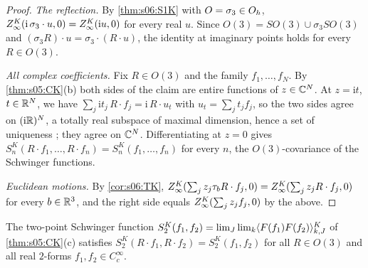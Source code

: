 \begin{proof}
\emph{The reflection.} By \cref{thm:s06:S1K} with $O=\sigma_3\in O_h$, $Z^{K}_{\infty}(\mathrm i\,\sigma_3\cdot u,0)=Z^{K}_{\infty}(\mathrm iu,0)$ for every
real $u$. Since $O(3)=SO(3)\cup\sigma_3SO(3)$ and $(\sigma_3R)\cdot u=\sigma_3\cdot(R\cdot u)$, the identity at imaginary points holds for
every $R\in O(3)$.

\emph{All complex coefficients.} Fix $R\in O(3)$ and the family $f_1,\dots,f_N$. By \cref{thm:s05:CK}(b) both sides of the claim are
entire functions of $z\in\mathbb C^N$. At $z=\mathrm it$, $t\in\mathbb R^N$, we have $\sum_j\mathrm it_j\,R\cdot f_j=\mathrm i\,R\cdot u_t$ with
$u_t=\sum_jt_jf_j$, so the two sides agree on $(\mathrm i\mathbb R)^N$, a totally real subspace of maximal dimension, hence a set of
uniqueness \cite{Hor90}; they agree on $\mathbb C^N$. Differentiating at $z=0$ gives $S^K_n(R\cdot f_1,\dots,R\cdot f_n)=S^K_n(f_1,\dots,f_n)$
for every $n$, the $O(3)$-covariance of the Schwinger functions.

\emph{Euclidean motions.} By \cref{cor:s06:TK}, $Z^{K}_{\infty}(\sum_jz_j\tau_bR\cdot f_j,0)=Z^{K}_{\infty}(\sum_jz_jR\cdot f_j,0)$ for every
$b\in\mathbb R^3$, and the right side equals $Z^{K}_{\infty}(\sum_jz_jf_j,0)$ by the above.
\end{proof}

\begin{corollary}\label{rot:cor:twopoint}
The two-point Schwinger function
$S^K_2(f_1,f_2)=\lim_J\lim_k\langle F(f_1)F(f_2)\rangle^{K}_{k,J}$ of \cref{thm:s05:CK}(c) satisfies $S^K_2(R\cdot f_1,R\cdot f_2)=S^K_2(f_1,f_2)$ for all
$R\in O(3)$ and all real $2$-forms $f_1,f_2\in C^\infty_c$.
\end{corollary}

